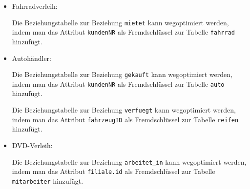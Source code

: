 \begin{Answer}[ref=Optimierung]
	\begin{itemize}
		\item Fahrradverleih:

		Die Beziehungstabelle zur Beziehung \lstinline!mietet! kann wegoptimiert werden, indem man das Attribut \lstinline!kundenNR! als Fremdschlüssel zur Tabelle \lstinline!fahrrad! hinzufügt.
		\item Autohändler:

		Die Beziehungstabelle zur Beziehung \lstinline!gekauft! kann wegoptimiert werden, indem man das Attribut \lstinline!kundenNR! als Fremdschlüssel zur Tabelle \lstinline!auto! hinzufügt.

		Die Beziehungstabelle zur Beziehung \lstinline!verfuegt! kann wegoptimiert werden, indem man das Attribut \lstinline!fahrzeugID! als Fremdschlüssel zur Tabelle \lstinline!reifen! hinzufügt.
		\item DVD-Verleih:

		Die Beziehungstabelle zur Beziehung \lstinline!arbeitet_in! kann wegoptimiert werden, indem man das Attribut \lstinline!filiale.id! als Fremdschlüssel zur Tabelle \lstinline!mitarbeiter! hinzufügt.
	\end{itemize}
\end{Answer}